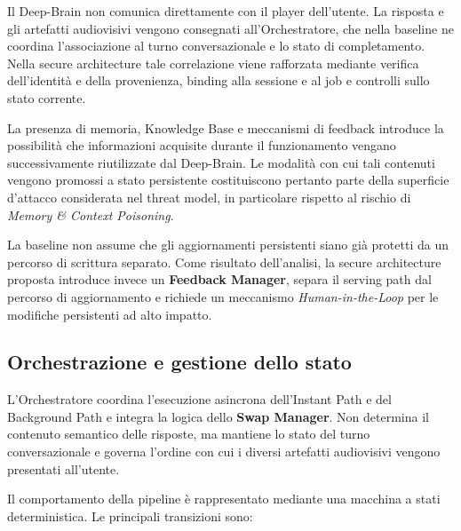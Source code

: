 \documentclass[11pt,a4paper]{article}
\begin{document}
Il Deep-Brain non comunica direttamente con il player dell'utente.
La risposta e gli artefatti audiovisivi vengono consegnati
all'Orchestratore, che nella baseline ne coordina l'associazione al
turno conversazionale e lo stato di completamento. Nella secure
architecture tale correlazione viene rafforzata mediante verifica
dell'identità e della provenienza, binding alla sessione e al job e
controlli sullo stato corrente.

La presenza di memoria, Knowledge Base e meccanismi di feedback
introduce la possibilità che informazioni acquisite durante il
funzionamento vengano successivamente riutilizzate dal Deep-Brain.
Le modalità con cui tali contenuti vengono promossi a stato persistente
costituiscono pertanto parte della superficie d'attacco considerata nel
threat model, in particolare rispetto al rischio di
\emph{Memory \& Context Poisoning}.

La baseline non assume che gli aggiornamenti persistenti siano già
protetti da un percorso di scrittura separato. Come risultato
dell'analisi, la secure architecture proposta introduce invece un
\textbf{Feedback Manager}, separa il serving path dal percorso di
aggiornamento e richiede un meccanismo \emph{Human-in-the-Loop} per
le modifiche persistenti ad alto impatto.

\subsection{Orchestrazione e gestione dello stato}

L'Orchestratore coordina l'esecuzione asincrona dell'Instant Path e del
Background Path e integra la logica dello \textbf{Swap Manager}. Non
determina il contenuto semantico delle risposte, ma mantiene lo stato
del turno conversazionale e governa l'ordine con cui i diversi artefatti
audiovisivi vengono presentati all'utente.

Il comportamento della pipeline è rappresentato mediante una macchina
a stati deterministica. Le principali transizioni sono:
\end{document}

